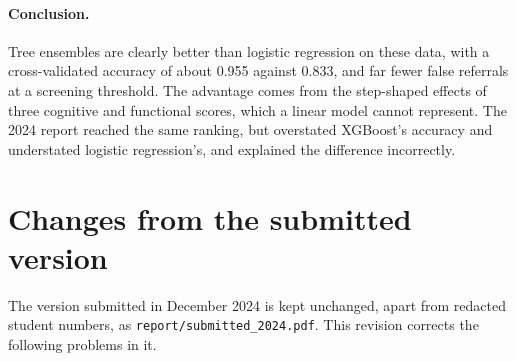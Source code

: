 \documentclass[11pt]{article}
\begin{document}
\paragraph{Conclusion.} Tree ensembles are clearly better than logistic regression on these data, with a
cross-validated accuracy of about 0.955 against 0.833, and far fewer false referrals at a screening threshold.
The advantage comes from the step-shaped effects of three cognitive and functional scores, which a linear
model cannot represent. The 2024 report reached the same ranking, but overstated XGBoost's accuracy and
understated logistic regression's, and explained the difference incorrectly.

\section{Changes from the submitted version}\label{sec:changes}
The version submitted in December 2024 is kept unchanged, apart from redacted student numbers, as
\texttt{report/submitted\_2024.pdf}. This revision corrects the following problems in it.
\end{document}
